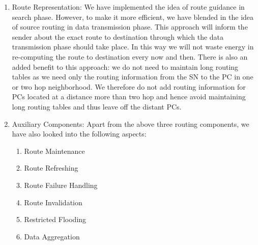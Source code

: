 \begin{enumerate}
        \par    
        We have also added an extra method in CTPInfo interface to acquire addresses of all the \acp{SN} in one hop neighborhood. This was done with the help of \textbf{getNeighborAddr} method. This method returns the address of all the \acp{SN} from it's routing table. As mentioned in previous section on route discovery, each \ac{SN} in \ac{CTP} maintains a routing table of size number of neighbors containing neighbor address and other relevant fields. We therefore exploit this routing table information by iterating through all the routing tables for the number of neighbors in one hop neighborhood (provided by CtpInfo numNeighbors method). Further, we store all the neighbor addresses in an array and return it. Although this method is currently not used in the model, but it can be quite useful in improving the network reliability and efficiency by precisely determining the \ac{SN} density around each of the \acp{SN} and further placing a \ac{PC} around it.   
        
        \item Route Representation: We have implemented the idea of route guidance in search phase. However, to make it more efficient, we have blended in the idea of source routing in data transmission phase. This approach will inform the sender about the exact route to destination through which the data transmission phase should take place. In this way we will not waste energy in re-computing the route to destination every now and then. There is also an added benefit to this approach: we do not need to maintain long routing tables as we need only the routing information from the \ac{SN} to the \ac{PC} in one or two hop neighborhood. We therefore do not add routing information for \acp{PC} located at a distance more than two hop and hence avoid maintaining long routing tables and thus leave off the distant \acp{PC}.
        
        \item Auxiliary Components: Apart from the above three routing components, we have also looked into the following aspects: 
    
        \begin{enumerate}
        	\item Route Maintenance
        	\item Route Refreshing
        	\item Route Failure Handling
        	\item Route Invalidation
        	\item Restricted Flooding
        	\item Data Aggregation
        \end{enumerate}
        

\end{enumerate}
